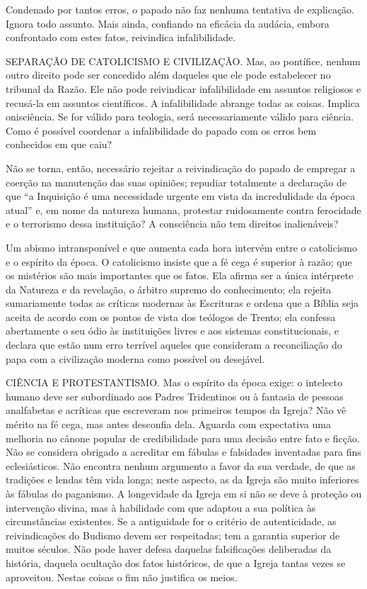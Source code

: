 \documentclass[11pt,a5paper,twoside,openany]{book}
\begin{document}
Condenado por tantos erros, o papado não faz nenhuma tentativa de explicação. Ignora todo assunto. Mais ainda, confiando na eficácia da audácia, embora confrontado com estes fatos, reivindica infalibilidade.

SEPARAÇÃO DE CATOLICISMO E CIVILIZAÇÃO. Mas, ao pontífice, nenhum outro direito pode ser concedido além daqueles que ele pode estabelecer no tribunal da Razão. Ele não pode reivindicar infalibilidade em assuntos religiosos e recusá-la em assuntos científicos. A infalibilidade abrange todas as coisas. Implica onisciência. Se for válido para teologia, será necessariamente válido para ciência. Como é possível coordenar a infalibilidade do papado com os erros bem conhecidos em que caiu?

Não se torna, então, necessário rejeitar a reivindicação do papado de empregar a coerção na manutenção das suas opiniões; repudiar totalmente a declaração de que “a Inquisição é uma necessidade urgente em vista da incredulidade da época atual” e, em nome da natureza humana, protestar ruidosamente contra ferocidade e o terrorismo dessa instituição? A consciência não tem direitos inalienáveis?

Um abismo intransponível e que aumenta cada hora intervém entre o catolicismo e o espírito da época. O catolicismo insiste que a fé cega é superior à razão; que os mistérios são mais importantes que os fatos. Ela afirma ser a única intérprete da Natureza e da revelação, o árbitro supremo do conhecimento; ela rejeita sumariamente todas as críticas modernas às Escrituras e ordena que a Bíblia seja aceita de acordo com os pontos de vista dos teólogos de Trento; ela confessa abertamente o seu ódio às instituições livres e aos sistemas constitucionais, e declara que estão num erro terrível aqueles que consideram a reconciliação do papa com a civilização moderna como possível ou desejável.

CIÊNCIA E PROTESTANTISMO. Mas o espírito da época exige: o intelecto humano deve ser subordinado aos Padres Tridentinos ou à fantasia de pessoas analfabetas e acríticas que escreveram nos primeiros tempos da Igreja? Não vê mérito na fé cega, mas antes desconfia dela. Aguarda com expectativa uma melhoria no cânone popular de credibilidade para uma decisão entre fato e ficção. Não se considera obrigado a acreditar em fábulas e falsidades inventadas para fins eclesiásticos. Não encontra nenhum argumento a favor da sua verdade, de que as tradições e lendas têm vida longa; neste aspecto, as da Igreja são muito inferiores às fábulas do paganismo. A longevidade da Igreja em si não se deve à proteção ou intervenção divina, mas à habilidade com que adaptou a sua política às circunstâncias existentes. Se a antiguidade for o critério de autenticidade, as reivindicações do Budismo devem ser respeitadas; tem a garantia superior de muitos séculos. Não pode haver defesa daquelas falsificações deliberadas da história, daquela ocultação dos fatos históricos, de que a Igreja tantas vezes se aproveitou. Nestas coisas o fim não justifica os meios.
\end{document}
